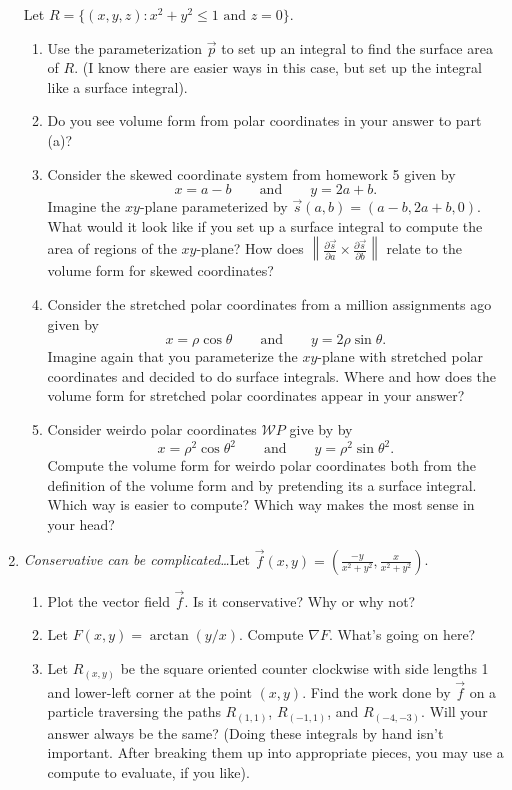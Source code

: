 \documentclass[letter]{article}
\begin{document}
\begin{enumerate}
			Let $R=\{(x,y,z):x^2+y^2\leq 1\text{ and }z=0\}$.
			\begin{enumerate}
				\item Use the parameterization $\vec p$ to set up an integral to find
					the surface area of $R$.  (I know there are easier ways in
					this case, but set up the integral like a surface integral).
				\item Do you see volume form from polar coordinates in your answer
					to part (a)?
				\item Consider the skewed coordinate system from homework 5 given by 
					\[
						x=a-b\qquad\text{and}\qquad y=2a+b.
					\]
					Imagine the $xy$-plane parameterized by $\vec s(a,b)=(a-b,2a+b,0)$.
					What would it look like if you set up a surface integral to compute
					the area of regions of the $xy$-plane?  How does $\left\| \frac{\partial \vec s}{\partial a}
					\times \frac{\partial \vec s}{\partial b}\right\|$ relate to the volume form
					for skewed coordinates?
				\item Consider the stretched polar coordinates from a million assignments ago given
					by
					\[
						x=\rho\cos \theta\qquad\text{and}\qquad y=2\rho\sin\theta.
					\]
					Imagine again that you parameterize the $xy$-plane with stretched
					polar coordinates and decided to do surface integrals.  Where
					and how does the volume form for stretched polar coordinates appear
					in your answer?
				\item Consider weirdo polar coordinates $\mathcal WP$ give by 
					by
					\[
						x=\rho^2\cos \theta^2\qquad\text{and}\qquad y=\rho^2\sin\theta^2.
					\]
					Compute the volume form for weirdo polar coordinates both from the definition
					of the volume form and by pretending its a surface integral.  Which way
					is easier to compute?  Which way makes the most sense in your head?
			\end{enumerate}

		\item \emph{Conservative can be complicated\ldots}Let $\vec f(x,y) = (\frac{-y}{x^2+y^2}, \frac{x}{x^2+y^2})$.
			\begin{enumerate}
				\item Plot the vector field $\vec f$.  Is it conservative?  Why or why not?
				\item Let $F(x,y)=\arctan(y/x)$.  Compute $\nabla F$.  What's going on here?
				\item Let $R_{(x,y)}$ be the square oriented counter clockwise
					with side lengths 1 and lower-left corner
					at the point $(x,y)$.  Find the work done by $\vec f$ on a particle 
					traversing the paths $R_{(1,1)}$, $R_{(-1,1)}$, and $R_{(-4,-3)}$.  
					Will your answer always be the same?  (Doing these integrals by hand
					isn't important.  After breaking them up into appropriate pieces, you may
					use a compute to evaluate, if you like).


\end{enumerate}
\end{enumerate}
\end{document}
